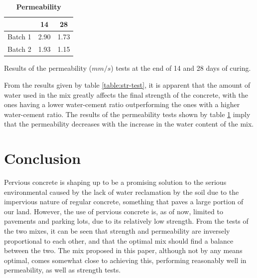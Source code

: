 \documentclass{ieeeaccess}
\begin{document}
\begin{table}[!htb]
    \begin{threeparttable}
        \caption{\textbf{Permeability}}
        \label{table:perm-test}
        \setlength{\tabcolsep}{16.5pt}
        \def\arraystretch{1.5}%
        \begin{tabular}{ l r r }
            \hline
            & \multicolumn{1}{c}{14} & \multicolumn{1}{c}{28} \\
            \hline

            Batch 1 & 2.90 & 1.73 \\ 
            Batch 2 & 1.93 & 1.15 \\

            \hline
        \end{tabular} 
        \begin{tablenotes}
            \item Results of the permeability ($mm/s$) tests at the end of 
            14 and 28 days of curing.
        \end{tablenotes}
    \end{threeparttable}
\end{table}

From the results given by table \ref{table:str-test}, it is apparent that the 
amount of water used in the mix greatly affects the final strength of the 
concrete, with the ones having a lower water-cement ratio outperforming the ones 
with a higher water-cement ratio.
The results of the permeability tests shown by table \ref{table:perm-test} imply
that the permeability decreases with the increase in the water content of the 
mix. 


\section{Conclusion}
Pervious concrete is shaping up to be a promising solution to the serious
environmental caused by the lack of water reclamation by the soil due to the
impervious nature of regular concrete, something that paves a large portion of
our land. However, the use of pervious concrete is, as of now, limited to
pavements and parking lots, due to its relatively low strength. 
From the tests of the two mixes, it can be seen that strength and permeability
are inversely proportional to each other, and that the optimal mix should find
a balance between the two. The mix proposed in this paper, although not by any
means optimal, comes somewhat close to achieving this, performing reasonably
well in permeability, as well as strength tests.
\end{document}
